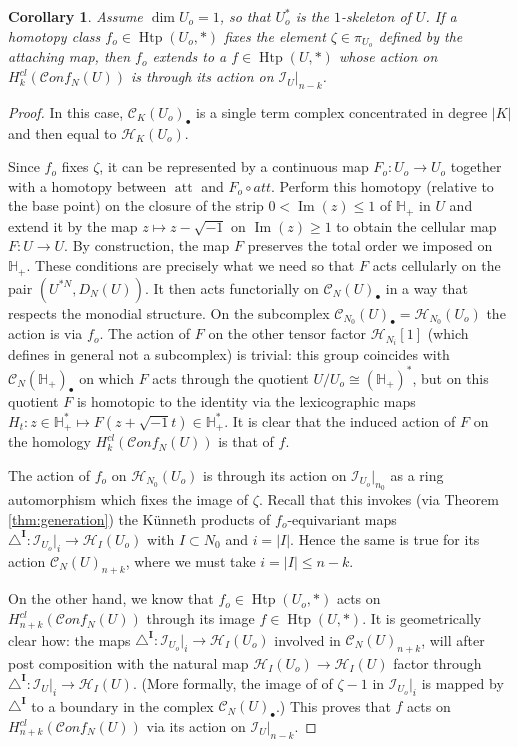 \documentclass[12pt,letterpaper]{amsart}
\numberwithin{equation}{section}
\def\HH{{\mathbb H}}
\def\Ibold{\mathbf {I}}
\def\tri{\triangle}
\def\Hcal{{\mathcal H}}
\def\Ical{{\mathcal I}}
\def\Cscr{{\mathscr C}}
\def\pt{{\scriptscriptstyle\bullet}}
\newcommand\att{\operatorname{att}}
\newcommand\conf{\mathscr{C}\!\mathit{onf}\!}
\newcommand\Htp{\operatorname{Htp}}
\newcommand\im{\operatorname{Im}}
\newtheorem{corollary}[theorem]{Corollary}
\theoremstyle{remark}
\begin{document}
\begin{corollary}\label{cor:zeta-generation}
Assume $\dim U_o=1$,  so that $U_o^*$ is the  $1$-skeleton of $U$. If  a homotopy class $f_o\in \Htp(U_o,*)$ fixes the element  $\zeta\in \pi_{U_o}$ defined by the attaching map,  then $f_o$ extends to a  $f\in \Htp(U,*)$ whose action on  $H^{cl}_k(\conf_N(U))$ is  through its action  on $\Ical_{U}|_{n-k}$.
\end{corollary}
\begin{proof}
In this case, $\Cscr_K(U_o)_\pt$ is a single term complex concentrated in degree $|K|$ and then equal to $\Hcal_K(U_o)$.

Since $f_o$ fixes $\zeta$, it can be represented by a continuous map $F_o:U_o\to U_o$ together with a homotopy between $\att$ and $F_o\circ att$. 
Perform this homotopy (relative to the base point) on the closure of the strip  $0<\im(z)\le 1$ of $\HH_+$ in $U$ and extend it by the map $z\mapsto z-\sqrt{-1}$ on $\im(z)\ge 1$ to obtain the cellular map $F: U\to U$. 
By construction, the map $F$  preserves the total order we imposed on $\HH_+$. These conditions are precisely what we need so that $F$ acts cellularly on the pair  $(U^{*N}, D_N(U))$.  It then acts functorially on  $\Cscr_N(U)_\pt$ in a way that respects the monodial structure. On the subcomplex $\Cscr_{N_0}(U)_\pt=\Hcal_{N_0}(U_o)$ the action is via $f_o$. 
The action of $F$ on the other  tensor factor $\Hcal_{N_i}[1]$ (which defines   in general not a subcomplex) is trivial: this group  coincides with 
$\Cscr_N(\HH_+)_\pt$ on which $F$ acts through the quotient $U/U_o\cong (\HH_+)^*$, but on this quotient 
$F$ is homotopic to the identity via the lexicographic maps $H_t:z\in \HH_+^*\mapsto F(z+\sqrt{-1}t)\in \HH_+^*$. It is clear that the induced action of $F$ on the  homology $H^{cl}_k(\conf_N(U))$ is that of $f$. 

The  action  of $f_o$ on $\Hcal_{N_0}(U_o)$ is through its action on  $\Ical_{U_o}|_{n_0}$ as a ring automorphism which  fixes the image of $\zeta$. Recall that this invokes (via Theorem \ref{thm:generation}) the K\"unneth products of  $f_o$-equivariant maps 
$\tri^\Ibold: \Ical_{U_o}|_i\to \Hcal_I(U_o)$ with $I\subset N_0$ and $i=|I|$.  
Hence  the same is true for its action  $\Cscr_{N}(U)_{n+k}$,  where we must take   $i=|I|\le n-k$. 

On the other hand,  we know that $f_o\in \Htp(U_o,*)$ acts on $H^{cl}_{n+k}(\conf_N(U))$ through its image 
$f\in \Htp(U,*)$. It is  geometrically  clear how: the maps $\tri^\Ibold: \Ical_{U_o}|_i\to \Hcal_I(U_o)$ involved in $\Cscr_{N}(U)_{n+k}$,  will after post composition  with the natural map  $\Hcal_I(U_o)\to \Hcal_I(U)$ factor through $\tri^\Ibold: \Ical_{U}|_i\to \Hcal_I(U)$. (More formally,  the image of  
of $\zeta-1 $ in  $\Ical_{U_o}|_i$ is mapped by $\tri^\Ibold$ to a  boundary in  the complex $\Cscr_{N}(U)_\pt$.)
This proves that $f$ acts on $H^{cl}_{n+k}(\conf_N(U))$ via its action on $\Ical_{U}|_{n-k}$.
\end{proof}
\end{document}
